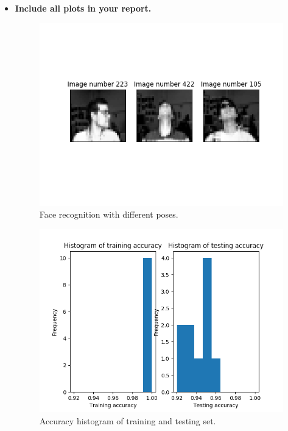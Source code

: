 \documentclass[a4paper]{article}
\begin{document}
\begin{itemize}
\item \textbf{Include all plots in your report.}

\begin{figure}[htp]
\centering
  \includegraphics[scale=0.45]{plots/face_recognition.png}
  \caption{Face recognition with different poses.}
  \label{plot_simple_nh2}
\end{figure}

\begin{figure}[htp]
\centering
\includegraphics[scale=0.45]{plots/face_recognition_histogram.png}
  \caption{Accuracy histogram of training and testing set.}
  \label{plot_simple_nh8}
\end{figure}


\end{itemize}
\end{document}
